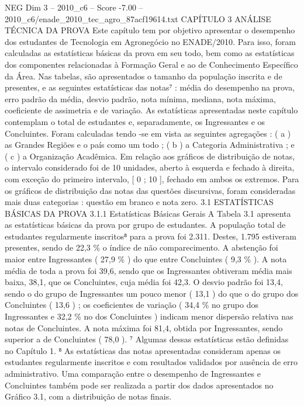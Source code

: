 \begin{textsample}{NEG Dim 3 – 2010\_c6 – Score -7.00 – 2010\_c6/enade\_2010\_tec\_agro\_87acf19614.txt}  \label{ex:f3_neg_011}
CAPÍTULO 3 ANÁLISE TÉCNICA DA PROVA Este capítulo tem por objetivo apresentar o desempenho dos estudantes de Tecnologia em Agronegócio no ENADE/2010.
Para isso, foram calculadas as estatísticas básicas da prova em seu todo, bem como as estatísticas dos componentes relacionadas à Formação Geral e ao de Conhecimento Específico da Área.
Nas tabelas, são apresentados o tamanho da população inscrita e de presentes, e as seguintes estatísticas das notas⁷ : média do desempenho na prova, erro padrão da média, desvio padrão, nota mínima, mediana, nota máxima, coeficiente de assimetria e de variação.
As estatísticas apresentadas neste capítulo contemplam o total de estudantes e, separadamente, os Ingressantes e os Concluintes.
Foram calculadas tendo -se em vista as seguintes agregações : ( a ) as Grandes Regiões e o país como um todo ; ( b ) a Categoria Administrativa ; e ( c ) a Organização Acadêmica.
Em relação aos gráficos de distribuição de notas, o intervalo considerado foi de 10 unidades, aberto à esquerda e fechado à direita, com exceção do primeiro intervalo, [ 0 ; 10 ], fechado em ambos os extremos.
Para os gráficos de distribuição das notas das questões discursivas, foram consideradas mais duas categorias : questão em branco e nota zero. 3.1 ESTATÍSTICAS BÁSICAS DA PROVA 3.1.1 Estatísticas Básicas Gerais A Tabela 3.1 apresenta as estatísticas básicas da prova por grupo de estudantes.
A população total de estudantes regularmente inscritos⁸ para a prova foi 2.311.
Destes, 1.795 estiveram presentes, sendo de 22,3 \% o índice de não comparecimento.
A abstenção foi maior entre Ingressantes ( 27,9 \% ) do que entre Concluintes ( 9,3 \% ).
A nota média de toda a prova foi 39,6, sendo que os Ingressantes obtiveram média mais baixa, 38,1, que os Concluintes, cuja média foi 42,3.
O desvio padrão foi 13,4, sendo o do grupo de Ingressantes um pouco menor ( 13,1 ) do que o do grupo dos Concluintes ( 13,6 ) ; os coeficientes de variação ( 34,4 \% no grupo dos Ingressantes e 32,2 \% no dos Concluintes ) indicam menor dispersão relativa nas notas de Concluintes.
A nota máxima foi 81,4, obtida por Ingressantes, sendo superior a de Concluintes ( 78,0 ). ⁷ Algumas dessas estatísticas estão definidas no Capítulo 1. ⁸ As estatísticas das notas apresentadas consideram apenas os estudantes regularmente inscritos e com resultados validados por ausência de erro administrativo.
Uma comparação entre o desempenho de Ingressantes e Concluintes também pode ser realizada a partir dos dados apresentados no Gráfico 3.1, com a distribuição de notas finais.

\end{textsample}
